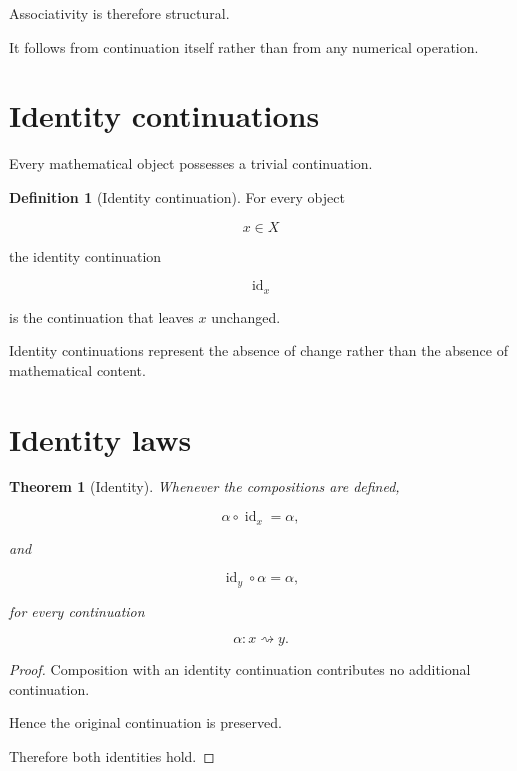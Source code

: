 \documentclass[13pt,openany]{book}
\theoremstyle{plain}
\newtheorem{theorem}{Theorem}[chapter]
\theoremstyle{definition}
\newtheorem{definition}{Definition}[chapter]
\begin{document}
Associativity is therefore structural.

It follows from continuation itself rather than from any numerical operation.

\section{Identity continuations}

Every mathematical object possesses a trivial continuation.

\begin{definition}[Identity continuation]
For every object

\[
x\in X
\]

the identity continuation

\[
\operatorname{id}_x
\]

is the continuation that leaves $x$ unchanged.
\end{definition}

Identity continuations represent the absence of change rather than the absence
of mathematical content.

\section{Identity laws}

\begin{theorem}[Identity]
Whenever the compositions are defined,

\[
\alpha\circ\operatorname{id}_x
=
\alpha,
\]

and

\[
\operatorname{id}_y\circ\alpha
=
\alpha,
\]

for every continuation

\[
\alpha:x\rightsquigarrow y.
\]
\end{theorem}

\begin{proof}
Composition with an identity continuation contributes no additional
continuation.

Hence the original continuation is preserved.

Therefore both identities hold.
\end{proof}
\end{document}
